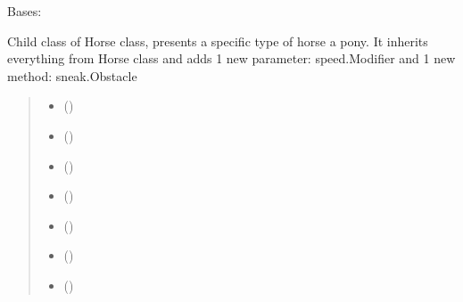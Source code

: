 \documentclass[letterpaper,10pt,english]{sphinxmanual}
\begin{document}
\begin{fulllineitems}
\label{\detokenize{main_package:main_package.Horse.Pony}}
\pysigstartsignatures
{}
\pysigstopsignatures
\sphinxAtStartPar
Bases: {\hyperref[\detokenize{main_package:main_package.Horse.Horse}]{}}

\sphinxAtStartPar
Child class of Horse class, presents a specific type of horse \sphinxhyphen{} a pony. It inherits everything from Horse class
and adds 1 new parameter: speed.Modifier and 1 new method: sneak.Obstacle
\begin{quote}\begin{description}
\begin{itemize}
\item {} 
\sphinxAtStartPar
{} ()

\item {} 
\sphinxAtStartPar
{} ()

\item {} 
\sphinxAtStartPar
{} ()

\item {} 
\sphinxAtStartPar
{} ()

\item {} 
\sphinxAtStartPar
{} ()

\item {} 
\sphinxAtStartPar
{} ()

\item {} 
\sphinxAtStartPar
{} ()


\end{itemize}
\end{description}
\end{quote}
\end{fulllineitems}
\end{document}
